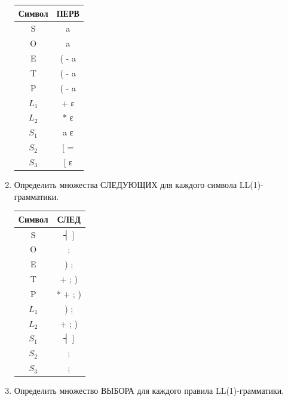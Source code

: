 \documentclass[a4paper,14pt]{extarticle}
\begin{document}
\begin{enumerate}[1.]
    \begin{tabular}{|c|c|}
        \hline
        Символ  & ПЕРВ  \\
        \hline
        S       & a     \\
        \hline
        O       & a     \\
        \hline
        E       & ( - a \\
        \hline
        T       & ( - a \\
        \hline
        P       & ( - a \\
        \hline
        $L_1$   & + ε   \\
        \hline
        $L_2$   & * ε   \\
        \hline
        $S_1$   & a ε   \\
        \hline
        $S_2$   & [ =   \\
        \hline
        $S_3$   & [ ε   \\
        \hline
    \end{tabular}

    \item Определить множества СЛЕДУЮЩИХ для каждого символа LL(1)-грамматики.
    \begin{tabular}{|c|c|}
        \hline
        Символ  & СЛЕД  \\
        \hline
        S       & ┤ ] \\
        \hline
        O       & ;\\
        \hline
        E       & ) ;\\
        \hline
        T       & + ; )\\
        \hline
        P       & * + ; )\\
        \hline
        $L_1$   & ) ;\\
        \hline
        $L_2$   & + ; )\\
        \hline
        $S_1$   & ┤ ] \\
        \hline
        $S_2$   & ;\\
        \hline
        $S_3$   & ;\\
        \hline
    \end{tabular}
    \item Определить множество ВЫБОРА для каждого правила LL(1)-грамматики.
    

\end{enumerate}
\end{document}

